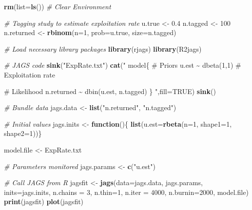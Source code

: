 \documentclass[
]{krantz}
\makeatletter
\newenvironment{Shaded}{\begin{snugshade}}{\end{snugshade}}
\newcommand{\AttributeTok}[1]{\textcolor[rgb]{0.27,0.27,0.27}{#1}}
\newcommand{\CommentTok}[1]{\textcolor[rgb]{0.37,0.37,0.37}{\textit{#1}}}
\newcommand{\ConstantTok}[1]{\textcolor[rgb]{0.37,0.37,0.37}{#1}}
\newcommand{\ControlFlowTok}[1]{\textcolor[rgb]{0.27,0.27,0.27}{\textbf{#1}}}
\newcommand{\DecValTok}[1]{\textcolor[rgb]{0.06,0.06,0.06}{#1}}
\newcommand{\FloatTok}[1]{\textcolor[rgb]{0.06,0.06,0.06}{#1}}
\newcommand{\FunctionTok}[1]{\textcolor[rgb]{0.27,0.27,0.27}{\textbf{#1}}}
\newcommand{\NormalTok}[1]{#1}
\newcommand{\OtherTok}[1]{\textcolor[rgb]{0.37,0.37,0.37}{#1}}
\newcommand{\StringTok}[1]{\textcolor[rgb]{0.5,0.5,0.5}{#1}}
\newenvironment{kframe}{%
\medskip{}
\setlength{\fboxsep}{.8em}
 \def\at@end@of@kframe{}%
 \ifinner\ifhmode%
  \def\at@end@of@kframe{\end{minipage}}%
  \begin{minipage}{\columnwidth}%
 \fi\fi%
 \def\FrameCommand##1{\hskip\@totalleftmargin \hskip-\fboxsep
 \colorbox{shadecolor}{##1}\hskip-\fboxsep
     \hskip-\linewidth \hskip-\@totalleftmargin \hskip\columnwidth}%
 \MakeFramed {\advance\hsize-\width
   \@totalleftmargin\z@ \linewidth\hsize
   \@setminipage}}%
 {\par\unskip\endMakeFramed%
 \at@end@of@kframe}
\renewenvironment{Shaded}{\begin{kframe}}{\end{kframe}}
\makeatother
\begin{document}
\begin{Shaded}
\begin{Highlighting}[]
\FunctionTok{rm}\NormalTok{(}\AttributeTok{list=}\FunctionTok{ls}\NormalTok{()) }\CommentTok{\# Clear Environment}

\CommentTok{\# Tagging study to estimate exploitation rate}
\NormalTok{u.true }\OtherTok{\textless{}{-}} \FloatTok{0.4}
\NormalTok{n.tagged }\OtherTok{\textless{}{-}} \DecValTok{100}
\NormalTok{n.returned }\OtherTok{\textless{}{-}} \FunctionTok{rbinom}\NormalTok{(}\AttributeTok{n=}\DecValTok{1}\NormalTok{, }\AttributeTok{prob=}\NormalTok{u.true, }\AttributeTok{size=}\NormalTok{n.tagged)}

\CommentTok{\# Load necessary library packages}
\FunctionTok{library}\NormalTok{(rjags)}
\FunctionTok{library}\NormalTok{(R2jags)}

\CommentTok{\# JAGS code}
\FunctionTok{sink}\NormalTok{(}\StringTok{"ExpRate.txt"}\NormalTok{)}
\FunctionTok{cat}\NormalTok{(}\StringTok{"}
\StringTok{model\{}
\StringTok{    \# Priors}
\StringTok{    u.est \textasciitilde{} dbeta(1,1)  \# Exploitation rate}

\StringTok{    \# Likelihood}
\StringTok{    n.returned \textasciitilde{} dbin(u.est, n.tagged)}
\StringTok{\}}
\StringTok{    "}\NormalTok{,}\AttributeTok{fill=}\ConstantTok{TRUE}\NormalTok{)}
\FunctionTok{sink}\NormalTok{()}

\CommentTok{\# Bundle data}
\NormalTok{jags.data }\OtherTok{\textless{}{-}} \FunctionTok{list}\NormalTok{(}\StringTok{"n.returned"}\NormalTok{, }\StringTok{"n.tagged"}\NormalTok{)}

\CommentTok{\# Initial values}
\NormalTok{jags.inits }\OtherTok{\textless{}{-}} \ControlFlowTok{function}\NormalTok{()\{ }\FunctionTok{list}\NormalTok{(}\AttributeTok{u.est=}\FunctionTok{rbeta}\NormalTok{(}\AttributeTok{n=}\DecValTok{1}\NormalTok{, }\AttributeTok{shape1=}\DecValTok{1}\NormalTok{, }\AttributeTok{shape2=}\DecValTok{1}\NormalTok{))\}}

\NormalTok{model.file }\OtherTok{\textless{}{-}} \StringTok{\textquotesingle{}ExpRate.txt\textquotesingle{}}

\CommentTok{\# Parameters monitored}
\NormalTok{jags.params }\OtherTok{\textless{}{-}} \FunctionTok{c}\NormalTok{(}\StringTok{"u.est"}\NormalTok{)}

\CommentTok{\# Call JAGS from R}
\NormalTok{jagsfit }\OtherTok{\textless{}{-}} \FunctionTok{jags}\NormalTok{(}\AttributeTok{data=}\NormalTok{jags.data, jags.params, }\AttributeTok{inits=}\NormalTok{jags.inits,}
                \AttributeTok{n.chains =} \DecValTok{3}\NormalTok{, }\AttributeTok{n.thin=}\DecValTok{1}\NormalTok{, }\AttributeTok{n.iter =} \DecValTok{4000}\NormalTok{, }\AttributeTok{n.burnin=}\DecValTok{2000}\NormalTok{,}
\NormalTok{                model.file)}
\FunctionTok{print}\NormalTok{(jagsfit)}
\FunctionTok{plot}\NormalTok{(jagsfit)}


\end{Highlighting}
\end{Shaded}
\end{document}
